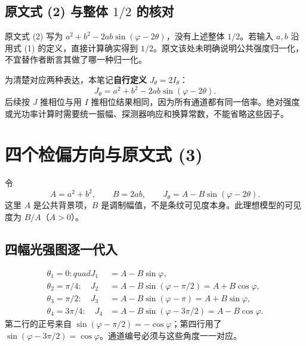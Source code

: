 \documentclass[UTF8,fontset=fandol,11pt,a4paper]{ctexart}
\begin{document}
\subsection{原文式 (2) 与整体 $1/2$ 的核对}
原文式 (2) 写为 $a^2+b^2-2ab\sin(\varphi-2\theta)$，没有上述整体 $1/2$。若输入 $a,b$ 沿用式 (1) 的定义，直接计算确实得到 $1/2$。原文该处未明确说明公共强度归一化，不宜替作者断言其做了哪一种归一化。

为清楚对应两种表达，本笔记\textbf{自行定义} $J_\theta=2I_\theta$：
\begin{equation}
\boxed{J_\theta=a^2+b^2-2ab\sin(\varphi-2\theta).}
\end{equation}
后续按 $J$ 推相位与用 $I$ 推相位结果相同，因为所有通道都有同一倍率。绝对强度或光功率计算时需要统一振幅、探测器响应和换算常数，不能省略这些因子。

\clearpage
\section{四个检偏方向与原文式 (3)}
令
\begin{equation}
A=a^2+b^2,\qquad B=2ab,\qquad J_\theta=A-B\sin(\varphi-2\theta).
\end{equation}
这里 $A$ 是公共背景项，$B$ 是调制幅值，不是条纹可见度本身。此理想模型的可见度为 $B/A$（$A>0$）。

\subsection{四幅光强图逐一代入}
\begin{align}
\theta_1=0:quad J_1
&=A-B\sin\varphi,\\
\theta_2=\pi/4:\quad J_2
&=A-B\sin(\varphi-\pi/2)=A+B\cos\varphi,\\
\theta_3=\pi/2:\quad J_3
&=A-B\sin(\varphi-\pi)=A+B\sin\varphi,\\
\theta_4=3\pi/4:\quad J_4
&=A-B\sin(\varphi-3\pi/2)=A-B\cos\varphi.
\end{align}
第二行的正号来自 $\sin(\varphi-\pi/2)=-\cos\varphi$；第四行用了 $\sin(\varphi-3\pi/2)=\cos\varphi$。通道编号必须与这些角度一一对应。
\end{document}
